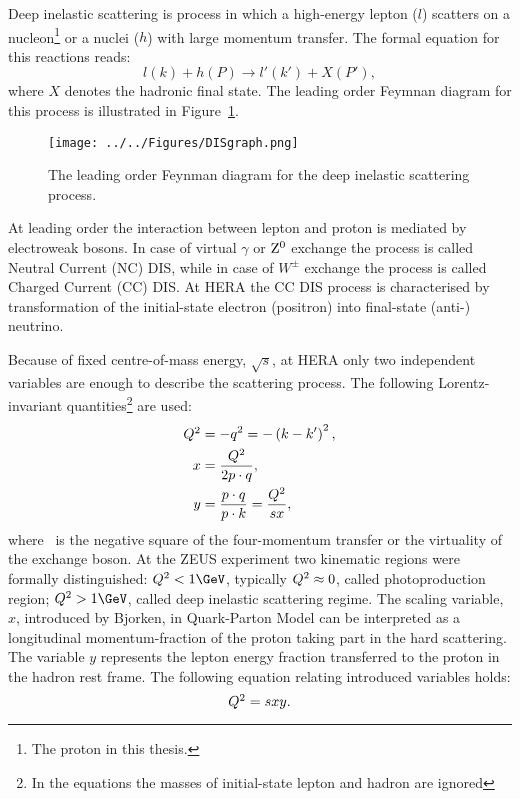 Deep inelastic scattering is process in which a high-energy lepton ($l$) scatters on a nucleon\footnote{The proton in this thesis.} or a nuclei ($h$) with large momentum transfer. The formal equation for this reactions reads:
\begin{equation}
l\left( k \right) + h\left( P \right) \rightarrow l'\left( k' \right) + X\left( P' \right),
\label{eq:DISreactions}
\end{equation}
where $X$ denotes the hadronic final state. The leading order Feymnan diagram for this process is illustrated in Figure~\ref{fig:DISgraph}.
\begin{figure}
	\centering
		\texttt{[image: ../../Figures/DISgraph.png]}
	\caption{The leading order Feynman diagram for the deep inelastic scattering process.}
	\label{fig:DISgraph}
\end{figure}
At leading order the interaction between lepton and proton is mediated by electroweak bosons. In case of virtual $\gamma$ or $\mbox{$\rm{Z}^0$}$ exchange the process is called Neutral Current (NC) DIS, while in case of $W^\pm$ exchange the process is called Charged Current (CC) DIS. At HERA the CC DIS process is characterised by transformation of the initial-state electron (positron) into final-state (anti-) neutrino.

Because of fixed centre-of-mass energy, $\sqrt{s}$, at HERA only two independent variables are enough to describe the scattering process. The following Lorentz-invariant quantities\footnote{In the equations the masses of initial-state lepton and hadron are ignored} are used:
\begin{align}
\mbox{${Q^2}$} &= -q^2 = -\left( k - k' \right)^2,\\
     x &= \frac{\mbox{${Q^2}$}}{2p\cdot q},\\
		 y &= \frac{p\cdot q}{p\cdot k} = \frac{\mbox{${Q^2}$}}{sx},
\label{eq:vardefinit}
\end{align}
where \qsq\, is the negative square of the four-momentum transfer or the virtuality of the exchange boson. At the ZEUS experiment two kinematic regions were formally distinguished: $\qsq < 1\GeV$, typically $\mbox{${Q^2}$} \approx 0$, called photoproduction region; $\qsq > 1\GeV$, called deep inelastic scattering regime. The scaling variable, $x$, introduced by Bjorken, in Quark-Parton Model can be interpreted as a longitudinal momentum-fraction of the proton taking part in the hard scattering. The variable $y$ represents the lepton energy fraction transferred to the proton in the hadron rest frame. The following equation relating introduced variables holds:
\begin{equation}
\mbox{${Q^2}$} = sxy.
\label{eq:qsxy}
\end{equation}

